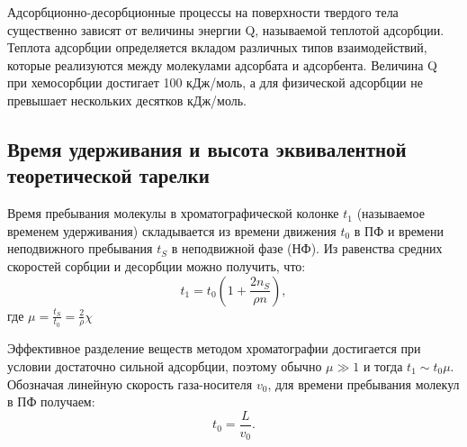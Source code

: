 \documentclass{article}
\begin{document}
\par Адсорбционно-десорбционные процессы на поверхности твердого тела существенно зависят от величины энергии Q, называемой теплотой адсорбции. Теплота адсорбции определяется вкладом различных типов взаимодействий, которые реализуются между молекулами адсорбата и адсорбента. Величина Q при хемосорбции достигает 100 кДж/моль, а для физической адсорбции не превышает нескольких десятков кДж/моль.
\subsection{Время удерживания и высота эквивалентной теоретической тарелки}\;
\par Время пребывания молекулы в хроматографической колонке $t_1$ (называемое временем удерживания) складывается из времени движения $t_0$ в ПФ и времени неподвижного пребывания $t_S$ в неподвижной фазе (НФ). Из равенства средних скоростей сорбции и десорбции можно получить, что:
\begin{equation}
t_1 = t_0 ( 1 + \frac{2n_S}{\rho n}),
\end{equation} 
где $\mu = \frac{t_S}{t_0} = \frac{2}{\rho} \chi$
\par Эффективное разделение веществ методом хроматографии достигается при условии достаточно сильной адсорбции, поэтому обычно $\mu \gg 1$ и тогда $t_1 \sim t_0 \mu$. Обозначая линейную скорость газа-носителя $v_0$, для времени пребывания молекул в ПФ получаем:
\begin{equation}
t_0 = \frac{L}{v_0}.
\end{equation}
\end{document}
